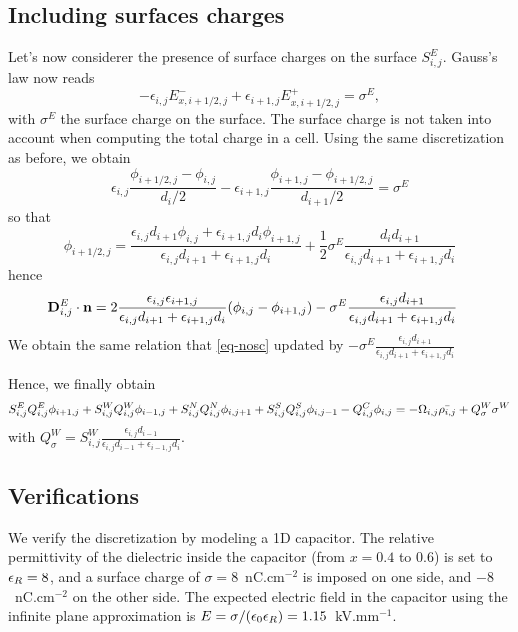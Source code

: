     \subsection{Including surfaces charges}
    Let's now considerer the presence of surface charges on the surface $S^E_{i,j}$.
    Gauss's law now reads
    \begin{equation} \label{eq-gausslawsc}
      -\epsilon_{i,j}E_{x, i+1/2,j}^- + \epsilon_{i+1,j}E_{x, i+1/2,j}^+ =\sigma^E,
    \end{equation}
    with $\sigma^E$ the surface charge on the surface.
    The surface charge is not taken into account when computing the total charge in a cell.
    Using the same discretization as before, we obtain
    \begin{equation}
    \epsilon_{i,j} \frac{\phi_{i+1/2,j} - \phi_{i,j}}{d_i/2} - \epsilon_{i+1,j} \frac{\phi_{i+1,j} - \phi_{i+1/2,j}}{d_{i+1}/2} = \sigma^E
    \end{equation}
    so that
    \begin{equation}
      \label{eq-phidemi}
    \phi_{i+1/2,j} = \frac{\epsilon_{i,j} d_{i+1} \phi_{i,j} + \epsilon_{i+1,j} d_{i} \phi_{i+1,j} }{\epsilon_{i,j} d_{i+1} + \epsilon_{i+1,j} d_{i} } + \frac{1}{2}\sigma^E \frac{d_i d_{i+1}}{\epsilon_{i,j} d_{i+1} + \epsilon_{i+1,j} d_{i}}
    \end{equation}
    hence
    \begin{align*}
    {\mathbf D}^E_{i,j} \cdot {\mathbf n} &= 2\frac{\epsilon_{i,j}\epsilon_{i+1,j}}{\epsilon_{i,j}d_{i+1} + \epsilon_{i+1,j} d_i} (\phi_{i,j}-\phi_{i+1,j}) - \sigma^E \frac{\epsilon_{i,j}d_{i+1}}{\epsilon_{i,j}d_{i+1}+\epsilon_{i+1,j}d_{i}}
    \end{align*}
    We obtain the same relation that \cref{eq-nosc} updated by $- \sigma^E \frac{\epsilon_{i,j}d_{i+1}}{\epsilon_{i,j}d_{i+1}+\epsilon_{i+1,j}d_{i}}$

    Hence, we finally obtain
    \begin{equation}
    S^E_{i,j} Q^E_{i,j} \phi_{i+1,j} + S^W_{i,j} Q^W_{i,j} \phi_{i-1,j} + S^N_{i,j} Q^N_{i,j} \phi_{i,j+1} + S^S_{i,j} Q^S_{i,j} \phi_{i,j-1} - Q^C_{i,j} \phi_{i,j} = - \Omega_{i,j} \bar{\rho_{i,j}} + Q^W_{\sigma} \sigma^W
    \end{equation}
    with $Q^W_{\sigma} =  S^W_{i,j} \frac{\epsilon_{i,j}d_{i-1}}{\epsilon_{i,j}d_{i-1}+\epsilon_{i-1,j}d_{i}}$.



  \subsection{Verifications}
    We verify the discretization by modeling a \ac{1D} capacitor.
    The relative permittivity of the dielectric inside the capacitor (from $x=0.4$ to $0.6$) is set to $\epsilon_{R} = 8$, and a surface charge of  $\sigma = 8$~nC.cm$^{-2}$ is imposed on one side, and $-8$~nC.cm$^{-2}$ on the other side.
    The expected electric field in the capacitor using the infinite plane approximation is $E = \sigma/(\epsilon_0\epsilon_{R}) = 1.15$~kV.mm$^{-1}$.

